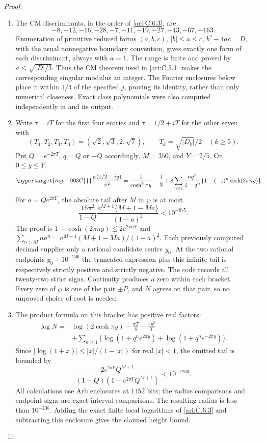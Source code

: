 \begin{proof}
\begin{enumerate}[label=\arabic*.,leftmargin=*]
\item The CM discriminants, in the order of \ref{ari:C.6.3}, are
\[
 -8,-12,-16,-28,-7,-11,-19,-27,-43,-67,-163.
\]
Enumeration of primitive reduced forms
$(a,b,c)$, $|b|\le a\le c$, $b^2-4ac=D$, with the usual
nonnegative boundary convention, gives exactly one form of
each discriminant, always with $a=1$.
The range is finite and proved by $a\le\sqrt{|D|/3}$.
Thus the CM theorem used in \ref{ari:C.5.1} makes the corresponding
singular modulus an integer. The Fourier enclosures below
place it within $1/4$ of the specified $j$, proving its
identity, rather than only numerical closeness. Exact class
polynomials were also computed independently in
 and its output.

\item Write $\tau=iT$ for the first four entries and
$\tau=1/2+iT$ for the other seven, with
\[
 (T_1,T_2,T_3,T_4)=(\sqrt2,\sqrt3,2,\sqrt7),\qquad
 T_k=\sqrt{|D_k|}/2\quad(k\ge5).
\]
Put $Q=e^{-2\pi T}$, $q=Q$ or $-Q$ accordingly,
$M=350$, and $Y=2/5$. On $0\le y\le Y$,
\begin{equation}\hypertarget{tag-003C}{}\label{ari:eq:ch-wp-bracket}
 \frac{\wp(1/2-iy)}{\pi^2}
 =\frac1{\cosh^2\pi y}-\frac13+
 8\sum_{n\ge1}\frac{nq^n}{1-q^n}
                 \{1-(-1)^n\cosh(2\pi ny)\}.
\end{equation}
For $a=Qe^{2\pi Y}$, the absolute tail after $M$ in
$\wp$ is at most
\[
 \frac{16\pi^2}{1-Q}
 \frac{a^{M+1}\{M+1-Ma\}}{(1-a)^2}<10^{-875}.
\]
The proof is $1+\cosh(2\pi ny)\le2e^{2\pi nY}$ and
$\sum_{n>M}na^n=a^{M+1}(M+1-Ma)/(1-a)^2$.
Each previously computed decimal supplies only a rational
candidate centre $y_0$. At the two rational endpoints
$y_0\pm10^{-240}$ the truncated expression plus this
infinite tail is respectively strictly positive and strictly
negative. The code records all twenty-two strict signs.
Continuity produces a zero within each bracket. Every zero
of $\wp$ is one of the pair $\pm P$, and $N$ agrees on
that pair, so no unproved choice of root is needed.

\item The product formula on this bracket has positive real factors:
\begin{align*}
 \log N={}&\log(2\cosh\pi y)-\frac{\pi T}{6}
                      -\frac{\pi y^2}{T}\\
 &+\sum_{n\ge1}\{\log(1+q^ne^{2\pi y})
                         +\log(1+q^ne^{-2\pi y})\}.
\end{align*}
Since $|\log(1+x)|\le |x|/(1-|x|)$ for real $|x|<1$,
the omitted tail is bounded by
\[
 \frac{2e^{2\pi Y}Q^{M+1}}
 {(1-Q)(1-e^{2\pi Y}Q^{M+1})}<10^{-1260}.
\]
All calculations use Arb enclosures at $1152$ bits; the
radius comparisons and endpoint signs are exact interval
comparisons. The resulting radius is less than $10^{-236}$.
Adding the exact finite local logarithms of \ref{ari:C.6.3} and
subtracting this enclosure gives the claimed height bound.


\end{enumerate}
\end{proof}
